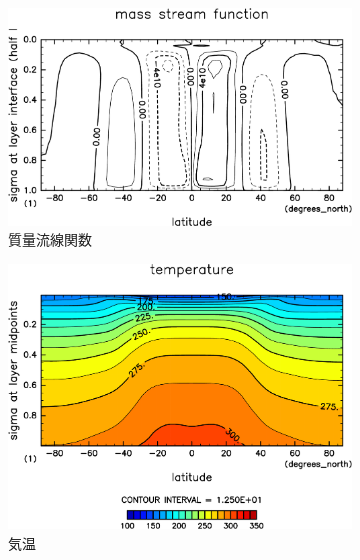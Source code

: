 \documentclass[body]{subfiles}
\begin{document}
\begin{figure}[t]
\begin{subfigure}{.4\textwidth}
		\centering
		\includegraphics[width=\columnwidth]{S1600/MSF,time=3650:4015-crop-rotate.pdf}
		\caption{質量流線関数\hmu*{[kg/s]}}\label{S1600質量流線関数}
	\end{subfigure}
	\begin{subfigure}{.4\textwidth}
		\centering
		\includegraphics[width=\columnwidth]{S1600/Temp,time=3650:4015-crop-rotate.pdf}
		\caption{気温\hmu*{[K]}}\label{S1600気温分布}
	\end{subfigure}
	\begin{subfigure}{.4\textwidth}
		\centering

\end{subfigure}
\end{figure}
\end{document}
